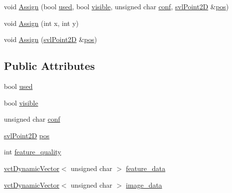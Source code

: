 \begin{DoxyCompactItemize}
\item 
void \hyperlink{structsvl_target2_d_a58853a145d50714d74192ad3ab15252c}{Assign} (bool \hyperlink{structsvl_target2_d_a74896ef54f0cdc80faaee2a7321635bc}{used}, bool \hyperlink{structsvl_target2_d_a90567161b27a6a1c1a8d1bd15c108d63}{visible}, unsigned char \hyperlink{structsvl_target2_d_adae08264a579759ab62b38ba347dc196}{conf}, \hyperlink{structsvl_point2_d}{svl\-Point2\-D} \&\hyperlink{structsvl_target2_d_ab68be6f073df6ae78c134a2515873b6c}{pos})
\item 
void \hyperlink{structsvl_target2_d_a87f4b1451255b0aa8dc1e75e74769383}{Assign} (int x, int y)
\item 
void \hyperlink{structsvl_target2_d_a3c5c8eab6595a614e8d3d00a28b89c2e}{Assign} (\hyperlink{structsvl_point2_d}{svl\-Point2\-D} \&\hyperlink{structsvl_target2_d_ab68be6f073df6ae78c134a2515873b6c}{pos})
\end{DoxyCompactItemize}
\subsection*{Public Attributes}
\begin{DoxyCompactItemize}
\item 
bool \hyperlink{structsvl_target2_d_a74896ef54f0cdc80faaee2a7321635bc}{used}
\item 
bool \hyperlink{structsvl_target2_d_a90567161b27a6a1c1a8d1bd15c108d63}{visible}
\item 
unsigned char \hyperlink{structsvl_target2_d_adae08264a579759ab62b38ba347dc196}{conf}
\item 
\hyperlink{structsvl_point2_d}{svl\-Point2\-D} \hyperlink{structsvl_target2_d_ab68be6f073df6ae78c134a2515873b6c}{pos}
\item 
int \hyperlink{structsvl_target2_d_a3eaf1d73276713940d630435ef04ff8f}{feature\-\_\-quality}
\item 
\hyperlink{classvct_dynamic_vector}{vct\-Dynamic\-Vector}$<$ unsigned char $>$ \hyperlink{structsvl_target2_d_a4450e7da880415189fd3f0714cf18ca5}{feature\-\_\-data}
\item 
\hyperlink{classvct_dynamic_vector}{vct\-Dynamic\-Vector}$<$ unsigned char $>$ \hyperlink{structsvl_target2_d_a26ffc8da663569e7a52982446600a476}{image\-\_\-data}
\end{DoxyCompactItemize}


